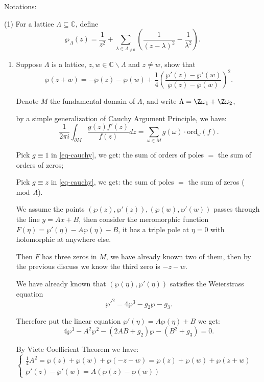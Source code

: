 Notations:

(1) For a lattice $\Lambda \subseteq \mathbb{C}$, define 
$$\wp_{\Lambda} (z) = \frac{1}{z^2} + \sum_{\lambda \in \Lambda_{\neq 0 }} \left(\frac{1}{(z-\lambda)^2} - \frac{1}{\lambda^2}\right).$$


\begin{enumerate}
    \item Suppose $\Lambda$ is a lattice, $z, w\in \mathbb{C} \backslash \Lambda$ and $z \neq w$, show that 
    $$\wp(z+w) = -\wp(z)-\wp(w) + \frac14(\frac{\wp'(z) - \wp'(w)}{\wp(z) - \wp(w)})^2.$$

    \begin{proofc}[解答]
    Denote $M$ the fundamental domain of $\Lambda$, and write $\Lambda = \Z \omega_1 + \Z \omega_2$, 
    
    by a simple generalization of Cauchy Argument Principle, we have:
    \begin{equation}
        \frac{1}{2\pi i} \int_{\partial M} \frac{g(z)f'(z)}{f(z)}dz = \sum_{\omega \in M} g(\omega) \cdot \mathrm{ord}_{\omega}(f). 
        \label{eq-cauchy}
    \end{equation}

    Pick $g \equiv 1$ in \eqref{eq-cauchy}, we get: the sum of orders of poles $=$ the sum of orders of zeros;

    Pick $g \equiv z$ in \eqref{eq-cauchy}, we get: the sum of poles $=$ the sum of zeros ($\mathrm{mod} \ \ \Lambda$).

    We assume the points $(\wp(z), \wp'(z)), (\wp(w), \wp'(w))$ passes through the line $y = Ax+B$, 
    then consider the meromorphic function $F(\eta) = \wp'(\eta) - A\wp(\eta) - B$, it has a triple pole at $\eta = 0$ with holomorphic at anywhere else.

    Then $F$ has three zeros in $M$, we have already known two of them, then by the previous discuss we know the third zero is $-z-w$.
    
    We have already known that $(\wp(\eta), \wp'(\eta))$ satisfies the Weierstrass equation 
    $$\wp'^2 = 4\wp^3 - g_2 \wp - g_3.$$

    Therefore put the linear equation $\wp'(\eta) = A\wp(\eta) + B$ we get:
    $$4\wp^3 - A^2\wp^2 - (2AB+g_2)\wp - (B^2+g_3) = 0.$$

    By Viete Coefficient Theorem we have:
    $\begin{cases}
        \frac{1}{4} A^2 = \wp(z)+\wp(w)+\wp(-z-w) = \wp(z) +\wp(w) + \wp(z+w) \\
        \wp'(z) - \wp'(w) = A(\wp(z) - \wp(w))
    \end{cases}$
    

\end{proofc}
\end{enumerate}
